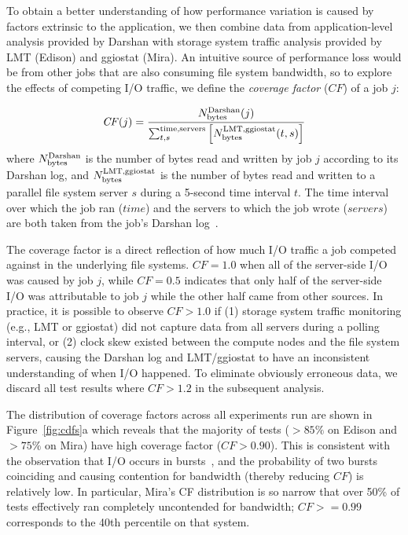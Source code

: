 To obtain a better understanding of how performance variation is caused by factors extrinsic to the application, we then combine data from application-level analysis provided by Darshan with storage system traffic analysis provided by LMT (Edison) and ggiostat (Mira).
An intuitive source of performance loss would be from other jobs that are also consuming file system bandwidth, so to explore the effects of competing I/O traffic, we define the \emph{coverage factor} ($\mathit{CF}$) of a job $j$:

\begin{equation} \label{eq:cf}
    \mathit{CF}(j) = \frac{N_{\textup{bytes}}^{\textup{Darshan}}(j)}
    {\sum_{t,s}^{\textup{time,servers}}
    \left [ N_{\textup{bytes}}^{\textup{LMT,ggiostat}}(t,s) \right ] }
\end{equation}
%
where $N_{\textup{bytes}}^{\textup{Darshan}}$ is the number of bytes read and written by job $j$ according to its Darshan log, and $N_{\textup{bytes}}^{\textup{LMT,ggiostat}}$ is the number of bytes read and written to a parallel file system server $s$ during a 5-second time interval $t$.
The time interval over which the job ran ($\mathit{time}$) and the servers to which the job wrote ($\mathit{servers}$) are both taken from the job's Darshan log~\cite{snyder2016modular}.

The coverage factor is a direct reflection of how much I/O traffic a job competed against in the underlying file systems.
$CF = 1.0$ when all of the server-side I/O was caused by job $j$, while $CF = 0.5$ indicates that only half of the server-side I/O was attributable to job $j$ while the other half came from other sources.
In practice, it is possible to observe $CF > 1.0$ if
(1) storage system traffic monitoring (e.g., LMT or ggiostat) did not capture data from all servers during a polling interval, or
(2) clock skew existed between the compute nodes and the file system servers, causing the Darshan log and LMT/ggiostat to have an inconsistent understanding of when I/O happened.
To eliminate obviously erroneous data, we discard all test results where $CF > 1.2$ in the subsequent analysis.

The distribution of coverage factors across all experiments run are shown in Figure~\ref{fig:cdfs}a which reveals that the majority of tests ($> 85\%$ on Edison and $> 75\%$ on Mira) have high coverage factor ($\mathit{CF} > 0.90$).
This is consistent with the observation that I/O occurs in bursts~\cite{Carns2011,Liu2016}, and the probability of two bursts coinciding and causing contention for bandwidth (thereby reducing $\mathit{CF}$) is relatively low.
In particular, Mira's CF distribution is so narrow that over 50\% of tests effectively ran completely uncontended for bandwidth; $\mathit{CF} >= 0.99$ corresponds to the 40th percentile on that system.

